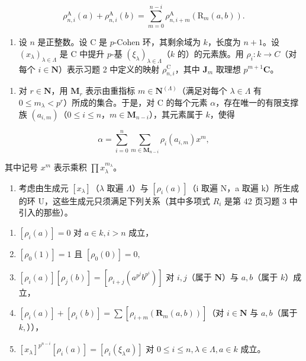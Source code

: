\[
\rho_ {n, i} ^ {\mathrm{A}} (a) + \rho_ {n, i} ^ {\mathrm{A}} (b) = \sum_ {m = 0} ^ {n - i} \rho_ {n, i + m} ^ {\mathrm{A}} (\mathrm{R} _ {m} (a, b)).
\]

\begin{enumerate}
\def\labelenumi{\arabic{enumi})}
\setcounter{enumi}{2}
\tightlist
\item
  设 \(n\) 是正整数。设 C 是 \(p\)-Cohen 环，其剩余域为 \(k\)，长度为 \(n+1\)。设 \((x_{\lambda})_{\lambda\in\Lambda}\) 是 C 中提升 \(p\)-基 \((\xi_{\lambda})_{\lambda\in\Lambda}\)（\(k\) 的）的元素族。用 \(\rho_{i}:k\to C\)（对每个 \(i\in\mathbf{N}\)）表示习题 2 中定义的映射 \(\rho_{n,i}^{\mathrm{C}}\)，其中 \(\mathbf{J}_{m}\) 取理想 \(p^{m+1}\mathbf{C}\)。
\end{enumerate}

\begin{enumerate}
\def\labelenumi{\alph{enumi})}
\tightlist
\item
  对 \(r \in \mathbf{N}\)，用 \(\mathbf{M}_r\) 表示由重指标 \(m \in \mathbf{N}^{(\Lambda)}\)（满足对每个 \(\lambda \in \Lambda\) 有 \(0 \leqslant m_{\lambda} < p^{r}\)）所成的集合。于是，对 C 的每个元素 \(\alpha\)，存在唯一的有限支撑族 \((a_{i,m})\)（\(0 \leqslant i \leqslant n\)，\(m \in \mathbf{M}_{n-i}\)），其元素属于 \(k\)，使得
\end{enumerate}

\[
\alpha = \sum_ {i = 0} ^ {n} \sum_ {m \in \mathbf {M} _ {n - i}} \rho_ {i} (a _ {i, m}) x ^ {m},
\]

其中记号 \(x^{m}\) 表示乘积 \(\prod x_{\lambda}^{m_{\lambda}}\)。

\begin{enumerate}
\def\labelenumi{\alph{enumi})}
\setcounter{enumi}{1}
\tightlist
\item
  考虑由生成元 \([x_{\lambda}]\)（\(\lambda\) 取遍 \(\Lambda\)）与 \([\rho_{i}(a)]\)（i 取遍 N，a 取遍 k）所生成的环 U，这些生成元只须满足下列关系（其中多项式 \(R_{i}\) 是第 42 页习题 3 中引入的那些）。
\end{enumerate}

\begin{enumerate}
\def\labelenumi{(\roman{enumi})}
\item
  \([\rho_i(a)] = 0\) 对 \(a \in k, i > n\) 成立，
\item
  \(\left[\rho_0(1)\right] = 1\) 且 \(\left[\rho_0(0)\right] = 0,\)
\item
  \([\rho_i(a)][\rho_j(b)] = [\rho_{i + j}(a^{p^j}b^{p^i})]\) 对 \(i,j\)（属于 \(\mathbf{N}\)）与 \(a,b\)（属于 \(k\)）成立，
\item
  \([\rho_i(a)] + [\rho_i(b)] = \sum [\rho_{i+m}(\mathbf{R}_m(a,b))]\)（对 \(i\in \mathbf{N}\) 与 \(a,b\)（属于 \(k,\)）），
\item
  \([x_{\lambda}]^{p^{n - i}}[\rho_i(a)] = [\rho_i(\xi_{\lambda}a)]\) 对 \(0 \leqslant i \leqslant n, \lambda \in \Lambda, a \in k\) 成立。
\end{enumerate}

